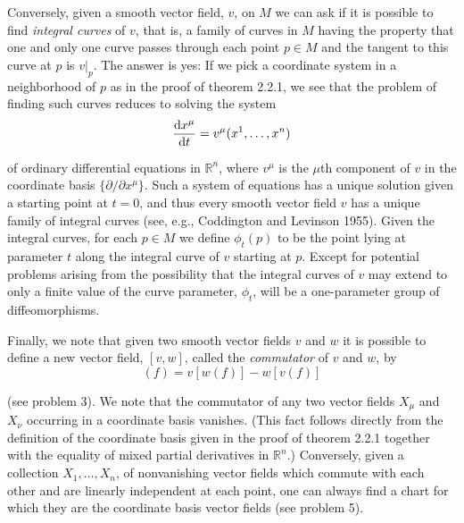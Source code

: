 Conversely, given a smooth vector field, $v$, on $M$ we can ask if it is possible to find \emph{integral curves} of $v$, that is, a family of curves in $M$ having the property that one and only one curve passes through each point $p\in M$ and the tangent to this curve at $p$ is $v|_p$. The answer is yes: If we pick a coordinate system in a neighborhood of $p$ as in the proof of theorem 2.2.1, we see that the problem of finding such curves reduces to solving the system
\begin{equation}
    \odv{x^\mu}t=v^\mu(x^1,\ldots,x^n)
    \label{2.2.13}
\end{equation}

of ordinary differential equations in $\mathbb{R}^n$, where $v^\mu$ is the $\mu$th component of $v$ in the coordinate basis $\{\partial/\partial x^\mu\}$. Such a system of equations has a unique solution given a starting point at $t=0$, and thus every smooth vector field $v$ has a unique family of integral curves (see, e.g., Coddington and Levinson 1955). Given the integral curves, for each $p\in M$ we define $\phi_t(p)$ to be the point lying at parameter $t$ along the integral curve of $v$ starting at $p$. Except for potential problems arising from the possibility that the integral curves of $v$ may extend to only a finite value of the curve parameter, $\phi_t$, will be a one-parameter group of diffeomorphisms.

Finally, we note that given two smooth vector fields $v$ and $w$ it is possible to define a new vector field, $[v,w]$, called the \emph{commutator} of $v$ and $w$, by
\begin{equation}
    [v,w](f)=v[w(f)]-w[v(f)]
    \label{2.2.14}
\end{equation}

(see problem 3). We note that the commutator of any two vector fields $X_\mu$ and $X_\nu$ occurring in a coordinate basis vanishes. (This fact follows directly from the definition of the coordinate basis given in the proof of theorem 2.2.1 together with the equality of mixed partial derivatives in $\mathbb{R}^n$.) Conversely, given a collection $X_1,\ldots,X_n$, of nonvanishing vector fields which commute with each other and are linearly independent at each point, one can always find a chart for which they are the coordinate basis vector fields (see problem 5). 

